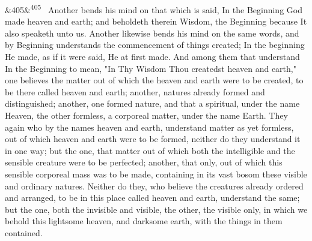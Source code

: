 \documentclass[12pt]{article}
\newcommand{\para}[1][]{\par\noindent\ifx&#1&\else\textsuperscript{\footnotesize #1}~\fi}
\begin{document}
\para[405] Another bends his mind on that which is said, In the Beginning God made heaven and earth; and beholdeth therein Wisdom, the Beginning because It also speaketh unto us. Another likewise bends his mind on the same words, and by Beginning understands the commencement of things created; In the beginning He made, as if it were said, He at first made. And among them that understand In the Beginning to mean, "In Thy Wisdom Thou createdst heaven and earth," one believes the matter out of which the heaven and earth were to be created, to be there called heaven and earth; another, natures already formed and distinguished; another, one formed nature, and that a spiritual, under the name Heaven, the other formless, a corporeal matter, under the name Earth. They again who by the names heaven and earth, understand matter as yet formless, out of which heaven and earth were to be formed, neither do they understand it in one way; but the one, that matter out of which both the intelligible and the sensible creature were to be perfected; another, that only, out of which this sensible corporeal mass was to be made, containing in its vast bosom these visible and ordinary natures. Neither do they, who believe the creatures already ordered and arranged, to be in this place called heaven and earth, understand the same; but the one, both the invisible and visible, the other, the visible only, in which we behold this lightsome heaven, and darksome earth, with the things in them contained.
\end{document}
